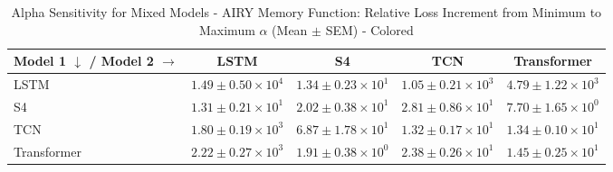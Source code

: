 
\begin{table}[h]
\centering
\caption{Alpha Sensitivity for Mixed Models - AIRY Memory Function: Relative Loss Increment from Minimum to Maximum $\alpha$ (Mean $\pm$ SEM) - Colored}
\label{tab:mixed_alpha_sensitivity_airy_colored}
\begin{tabular}{lcccc}
\hline
Model 1 $\downarrow$ / Model 2 $\rightarrow$ & LSTM & S4 & TCN & Transformer \\
\hline
LSTM & \cellcolor{gray!20}$1.49 \pm 0.50 \times 10^{4}$ & \cellcolor{green!30!white}$1.34 \pm 0.23 \times 10^{1}$ & \cellcolor{green!30!white}$1.05 \pm 0.21 \times 10^{3}$ & \cellcolor{green!21!white}$4.79 \pm 1.22 \times 10^{3}$ \\
S4 & \cellcolor{green!30!white}$1.31 \pm 0.21 \times 10^{1}$ & \cellcolor{gray!20}$2.02 \pm 0.38 \times 10^{1}$ & \cellcolor{red!30!white}$2.81 \pm 0.86 \times 10^{1}$ & \cellcolor{green!30!white}$7.70 \pm 1.65 \times 10^{0}$ \\
TCN & \cellcolor{green!30!white}$1.80 \pm 0.19 \times 10^{3}$ & \cellcolor{red!30!white}$6.87 \pm 1.78 \times 10^{1}$ & \cellcolor{gray!20}$1.32 \pm 0.17 \times 10^{1}$ & \cellcolor{green!1!white}$1.34 \pm 0.10 \times 10^{1}$ \\
Transformer & \cellcolor{green!30!white}$2.22 \pm 0.27 \times 10^{3}$ & \cellcolor{green!30!white}$1.91 \pm 0.38 \times 10^{0}$ & \cellcolor{red!30!white}$2.38 \pm 0.26 \times 10^{1}$ & \cellcolor{gray!20}$1.45 \pm 0.25 \times 10^{1}$ \\
\hline
\end{tabular}
\end{table}
